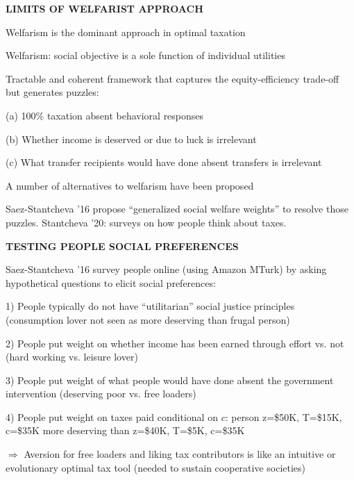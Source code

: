 \documentclass[landscape]{slides}
\begin{document}
\begin{slide}
\begin{center}
{\bf LIMITS OF WELFARIST APPROACH}
\end{center}
Welfarism is the dominant approach in optimal taxation 

Welfarism: social objective is a sole function of individual utilities

Tractable and coherent framework that captures the equity-efficiency trade-off but generates puzzles:

\small

(a) 100\% taxation absent behavioral responses

(b) Whether income is deserved or due to luck is irrelevant

(c) What transfer recipients would have done absent transfers is irrelevant


\normalsize
A number of alternatives to welfarism have been proposed 

Saez-Stantcheva '16 propose ``generalized social welfare weights'' to resolve
those puzzles. Stantcheva '20: surveys on how people think about taxes.

\end{slide}


\begin{slide}
\begin{center}
{\bf TESTING PEOPLE SOCIAL PREFERENCES}
\end{center}
Saez-Stantcheva '16 survey people online (using Amazon MTurk) by asking hypothetical questions
to elicit social preferences:

1) People typically do not have ``utilitarian'' social justice principles (consumption lover not seen as more
deserving than frugal person)

2) People put weight on whether income has been earned through effort vs. not (hard working
vs. leisure lover)

3) People put weight of what people would have done absent the government intervention
(deserving poor vs. free loaders)

4) People put weight on taxes paid conditional on $c$: person z=\$50K, T=\$15K, c=\$35K more deserving than z=\$40K, T=\$5K, c=\$35K


\small
$\Rightarrow$ Aversion for free loaders and liking tax contributors  is like an intuitive or evolutionary optimal tax tool
(needed to sustain cooperative societies)

\end{slide}
\end{document}
